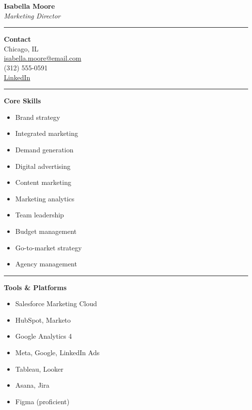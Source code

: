 \documentclass[11pt,a4paper]{article}
\begin{document}
\noindent
\begin{minipage}[t]{0.34\textwidth}
\small\color{sidebartext}

\begin{center}
  {\large\textbf{Isabella Moore}}\\[2pt]
  \textit{Marketing Director}
\end{center}

\vspace{4pt}
\noindent\rule{\linewidth}{0.5pt}

\vspace{4pt}
\noindent\textbf{Contact}\\
Chicago, IL\\
\href{mailto:isabella.moore@email.com}{isabella.moore@email.com}\\
(312) 555-0591\\
\href{https://linkedin.com/in/isabellamoore}{LinkedIn}

\vspace{6pt}
\noindent\rule{\linewidth}{0.4pt}

\noindent\textbf{Core Skills}
\begin{itemize}
  \item Brand strategy
  \item Integrated marketing
  \item Demand generation
  \item Digital advertising
  \item Content marketing
  \item Marketing analytics
  \item Team leadership
  \item Budget management
  \item Go-to-market strategy
  \item Agency management
\end{itemize}

\vspace{4pt}
\noindent\rule{\linewidth}{0.4pt}

\noindent\textbf{Tools \& Platforms}
\begin{itemize}
  \item Salesforce Marketing Cloud
  \item HubSpot, Marketo
  \item Google Analytics 4
  \item Meta, Google, LinkedIn Ads
  \item Tableau, Looker
  \item Asana, Jira
  \item Figma (proficient)
\end{itemize}


\end{minipage}
\end{document}
